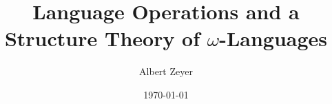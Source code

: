 \documentclass{article}
\begin{document}
\title{Language Operations and a Structure Theory of $\omega$-Languages}
\author{Albert Zeyer}
\date{\today}

\maketitle
\tableofcontents




%


%





\printindex
\end{document}
